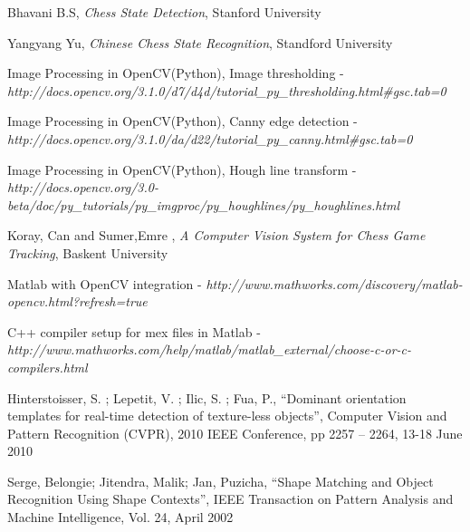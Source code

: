 \documentclass[conference]{IEEEtran}
\begin{document}
\begin{thebibliography}{1}

Bhavani B.S, \emph{Chess State Detection}, Stanford University \newline

Yangyang Yu, \emph{Chinese Chess State Recognition}, Standford University \newline

Image Processing in OpenCV(Python), Image thresholding - \textit{http://docs.opencv.org/3.1.0/d7/d4d/tutorial\_py\_thresholding.html\#gsc.tab=0} \newline

Image Processing in OpenCV(Python), Canny edge detection - \textit{http://docs.opencv.org/3.1.0/da/d22/tutorial\_py\_canny.html\#gsc.tab=0} \newline

Image Processing in OpenCV(Python), Hough line transform - \textit{http://docs.opencv.org/3.0-beta/doc/py\_tutorials/py\_imgproc/py\_houghlines/py\_houghlines.html} \newline

Koray, Can and Sumer,Emre , \emph{A Computer Vision System for Chess Game Tracking}, Baskent University \newline

Matlab with OpenCV integration - \textit{http://www.mathworks.com/discovery/matlab-opencv.html?refresh=true} \newline

C++ compiler setup for mex files in Matlab - \textit{http://www.mathworks.com/help/matlab/matlab\_external/choose-c-or-c-compilers.html} \newline

Hinterstoisser, S. ; Lepetit, V. ; Ilic, S. ; Fua, P., “Dominant orientation templates for real-time detection of texture-less objects”, Computer Vision and Pattern Recognition (CVPR), 2010 IEEE Conference, pp 2257 – 2264, 13-18 June 2010 \newline

Serge, Belongie; Jitendra, Malik; Jan, Puzicha, “Shape Matching and Object Recognition Using Shape Contexts”, IEEE Transaction on Pattern Analysis and Machine Intelligence, Vol. 24, April 2002

\end{thebibliography}




\end{document}
